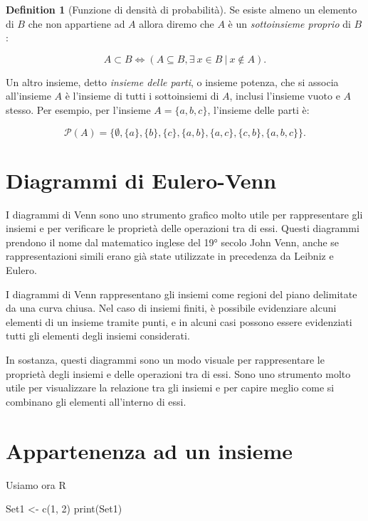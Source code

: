\documentclass[
  letterpaper,
  DIV=11,
  numbers=noendperiod,
  oneside]{scrreprt}
\newenvironment{Shaded}{\begin{snugshade}}{\end{snugshade}}
\newcommand{\DecValTok}[1]{\textcolor[rgb]{0.68,0.00,0.00}{#1}}
\newcommand{\FunctionTok}[1]{\textcolor[rgb]{0.28,0.35,0.67}{#1}}
\newcommand{\NormalTok}[1]{\textcolor[rgb]{0.00,0.23,0.31}{#1}}
\newcommand{\OtherTok}[1]{\textcolor[rgb]{0.00,0.23,0.31}{#1}}
\theoremstyle{definition}
\theoremstyle{plain}
\theoremstyle{definition}
\newtheorem{definition}{Definition}[chapter]
\theoremstyle{remark}
\begin{document}
\begin{definition}[Funzione di densità di
probabilità]
Se esiste almeno un elemento di \(B\) che non appartiene ad \(A\) allora
diremo che \(A\) è un \emph{sottoinsieme proprio} di \(B\):

\[
A \subset B \iff (A \subseteq B, \exists~ x \in B ~\vert~ x \notin A).
\]

Un altro insieme, detto \emph{insieme delle parti}, o insieme potenza,
che si associa all'insieme \(A\) è l'insieme di tutti i sottoinsiemi di
\(A\), inclusi l'insieme vuoto e \(A\) stesso. Per esempio, per
l'insieme \(A = \{a, b, c\}\), l'insieme delle parti è:

\[
\mathcal{P}(A) = \{
\emptyset, \{a\}, \{b\}, \{c\},
 \{a, b\}, \{a, c\}, \{c, b\},
 \{a, b, c\}
\}.
\]

\section{Diagrammi di Eulero-Venn}\label{diagrammi-di-eulero-venn}

I diagrammi di Venn sono uno strumento grafico molto utile per
rappresentare gli insiemi e per verificare le proprietà delle operazioni
tra di essi. Questi diagrammi prendono il nome dal matematico inglese
del 19° secolo John Venn, anche se rappresentazioni simili erano già
state utilizzate in precedenza da Leibniz e Eulero.

I diagrammi di Venn rappresentano gli insiemi come regioni del piano
delimitate da una curva chiusa. Nel caso di insiemi finiti, è possibile
evidenziare alcuni elementi di un insieme tramite punti, e in alcuni
casi possono essere evidenziati tutti gli elementi degli insiemi
considerati.

In sostanza, questi diagrammi sono un modo visuale per rappresentare le
proprietà degli insiemi e delle operazioni tra di essi. Sono uno
strumento molto utile per visualizzare la relazione tra gli insiemi e
per capire meglio come si combinano gli elementi all'interno di essi.

\section{Appartenenza ad un insieme}\label{appartenenza-ad-un-insieme}

Usiamo ora R

\begin{Shaded}
\begin{Highlighting}[]
\NormalTok{Set1 }\OtherTok{\textless{}{-}} \FunctionTok{c}\NormalTok{(}\DecValTok{1}\NormalTok{, }\DecValTok{2}\NormalTok{)}
\FunctionTok{print}\NormalTok{(Set1)}
\end{Highlighting}
\end{Shaded}


\end{definition}
\end{document}
